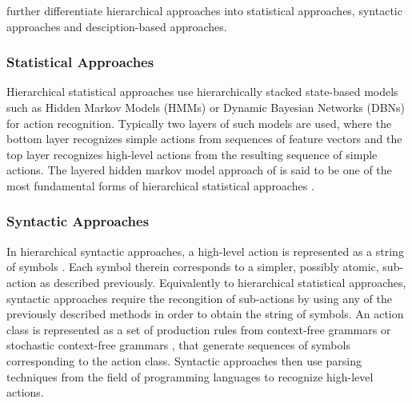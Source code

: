 \textcite{aggarwal_human_2011} further differentiate hierarchical approaches into statistical approaches, syntactic approaches and desciption-based approaches.


\subsubsection{Statistical Approaches} 
Hierarchical statistical approaches use hierarchically stacked state-based models such as Hidden Markov Models (HMMs) \cite{oliver_layered_2002}\cite{zhang_modeling_2004} or Dynamic Bayesian Networks (DBNs) \cite{dai_group_2008}\cite{gong_recognition_2003} for action recognition.
Typically two layers of such models are used, where the bottom layer recognizes simple actions from sequences of feature vectors and the top layer recognizes high-level actions from the resulting sequence of simple actions.
The layered hidden markov model approach of \textcite{oliver_layered_2002} is said to be one of the most fundamental forms of hierarchical statistical approaches \cite{aggarwal_human_2011}.


\subsubsection{Syntactic Approaches} 
In hierarchical syntactic approaches, a high-level action is represented as a string of symbols \cite{cheng_advances_2015}.
Each symbol therein corresponds to a simpler, possibly atomic, sub-action as described previously.
Equivalently to hierarchical statistical approaches, syntactic approaches require the recongition of sub-actions by using any of the previously described methods in order to obtain the string of symbols.
An action class is represented as a set of production rules from context-free grammars or stochastic context-free grammars \cite{ivanov_recognition_2000}\cite{moore_recognizing_2002}\cite{minnen_expectation_2003}\cite{joo_attribute_2006}, that generate sequences of symbols corresponding to the action class.
Syntactic approaches then use parsing techniques from the field of programming languages \cite{hopcroft_introduction_1979} to recognize high-level actions.


